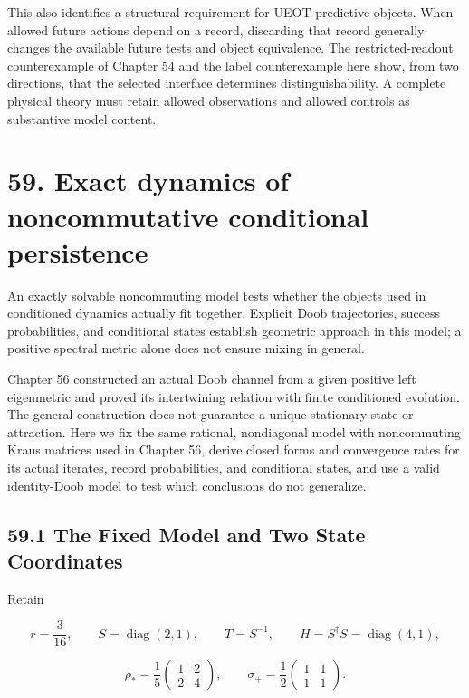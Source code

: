 \documentclass[
  11pt,
  oneside]{book}
\begin{document}
This also identifies a structural requirement for UEOT predictive
objects. When allowed future actions depend on a record, discarding that
record generally changes the available future tests and object
equivalence. The restricted-readout counterexample of Chapter 54 and the
label counterexample here show, from two directions, that the selected
interface determines distinguishability. A complete physical theory must
retain allowed observations and allowed controls as substantive model
content.

\chapter{59. Exact dynamics of noncommutative conditional
persistence}\label{ch-59}

An exactly solvable noncommuting model tests whether the objects used in
conditioned dynamics actually fit together. Explicit Doob trajectories,
success probabilities, and conditional states establish geometric
approach in this model; a positive spectral metric alone does not ensure
mixing in general.

Chapter 56 constructed an actual Doob channel from a given positive left
eigenmetric and proved its intertwining relation with finite conditioned
evolution. The general construction does not guarantee a unique
stationary state or attraction. Here we fix the same rational,
nondiagonal model with noncommuting Kraus matrices used in Chapter 56,
derive closed forms and convergence rates for its actual iterates,
record probabilities, and conditional states, and use a valid
identity-Doob model to test which conclusions do not generalize.

\section{59.1 The Fixed Model and Two State Coordinates}

Retain

\[
r=\frac3{16},\qquad S=\operatorname{diag}(2,1),\qquad T=S^{-1},\qquad
H=S^\dagger S=\operatorname{diag}(4,1),
\]

\[
\rho_* =\frac15\begin{pmatrix}1&2\\2&4\end{pmatrix},\qquad
\sigma_+=\frac12\begin{pmatrix}1&1\\1&1\end{pmatrix}.
\]
\end{document}
